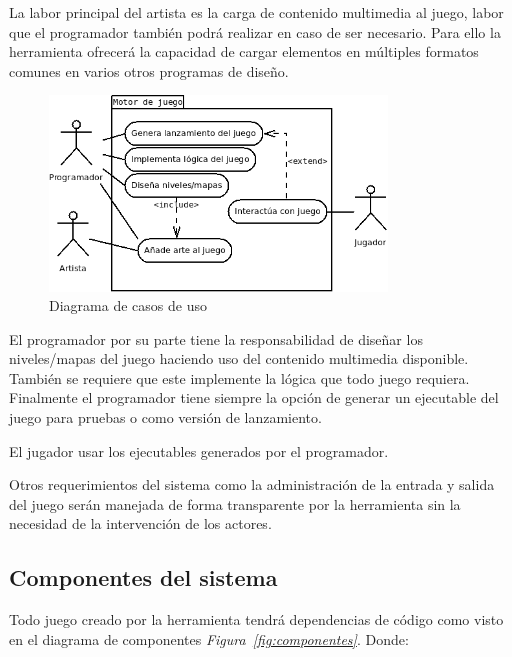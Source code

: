La labor principal del artista es la carga de contenido multimedia al juego, labor que el programador también podrá realizar en caso de ser necesario. Para ello la herramienta ofrecerá la capacidad de cargar elementos en múltiples formatos comunes en varios otros programas de diseño.

\begin{figure}[h]
\centering
\includegraphics[width=0.8\textwidth]{MCU}
\caption[Diagrama de casos de uso]{Diagrama de casos de uso}
\label{fig:MCU}
\end{figure}

El programador por su parte tiene la responsabilidad de diseñar los niveles/mapas del juego haciendo uso del contenido multimedia disponible. También se requiere que este implemente la lógica que todo juego requiera. Finalmente el programador tiene siempre la opción de generar un ejecutable del juego para pruebas o como versión de lanzamiento.

El jugador usar los ejecutables generados por el programador.

Otros requerimientos del sistema como la administración de la entrada y salida del juego serán manejada de forma transparente por la herramienta sin la necesidad de la intervención de los actores.

\subsection{Componentes del sistema}

Todo juego creado por la herramienta tendrá dependencias de código como visto en el diagrama de componentes \emph{Figura~\ref{fig:componentes}}. Donde:

